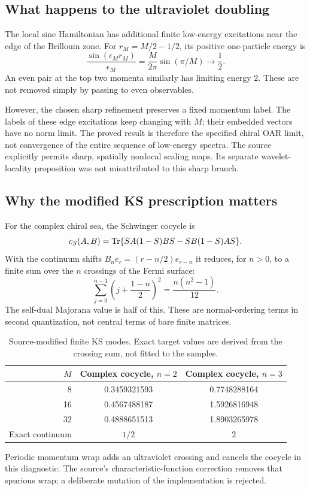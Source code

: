 \subsection{What happens to the ultraviolet doubling}

The local sine Hamiltonian has additional finite low-energy excitations near
the edge of the Brillouin zone. For
$r_M=M/2-1/2$, its positive one-particle energy is
\[
 \frac{\sin(\epsilon_Mr_M)}{\epsilon_M}
   =\frac{M}{2\pi}\sin(\pi/M)\longrightarrow\frac12.
\]
An even pair at the top two momenta similarly has limiting energy $2$.
These are not removed simply by passing to even observables.

However, the chosen sharp refinement preserves a fixed momentum label.
The labels of these edge excitations keep changing with $M$; their embedded
vectors have no norm limit. The proved result is therefore the specified
chiral OAR limit, not convergence of the entire sequence of low-energy
spectra. The source explicitly permits sharp, spatially nonlocal scaling
maps. Its separate wavelet-locality proposition was not misattributed to
this sharp branch.

\subsection{Why the modified KS prescription matters}

For the complex chiral sea, the Schwinger cocycle is
\[
 c_S(A,B)=\operatorname{Tr}\{SA(1-S)BS-SB(1-S)AS\}.
\]
With the continuum shifts $B_ne_r=(r-n/2)e_{r-n}$ it reduces, for $n>0$,
to a finite sum over the $n$ crossings of the Fermi surface:
\[
 \sum_{j=0}^{n-1}\left(j+\frac{1-n}{2}\right)^2
   =\frac{n(n^2-1)}{12}.
\]
The self-dual Majorana value is half of this. These are normal-ordering
terms in second quantization, not central terms of bare finite matrices.

\begin{table}[h]
\centering
\begin{tabular}{@{}rcc@{}}
\toprule
$M$ & Complex cocycle, $n=2$ & Complex cocycle, $n=3$\\\midrule
8 & 0.3459321593 & 0.7748288164\\
16 & 0.4567488187 & 1.5926816948\\
32 & 0.4888651513 & 1.8903265978\\
Exact continuum & $1/2$ & $2$\\\bottomrule
\end{tabular}
\caption{Source-modified finite KS modes. Exact target values are derived
from the crossing sum, not fitted to the samples.}
\end{table}
Periodic momentum wrap adds an ultraviolet crossing and cancels the cocycle
in this diagnostic. The source's characteristic-function correction removes
that spurious wrap; a deliberate mutation of the implementation is rejected.

